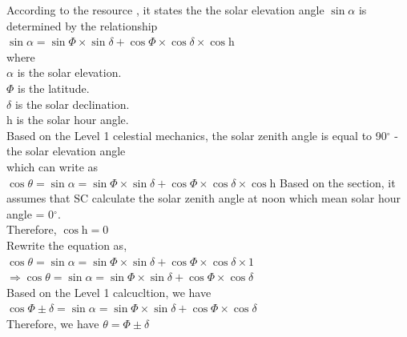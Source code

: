 \documentclass[12pt]{article}
\begin{document}
According to the resource \cite{Harold1968}, it states the the solar elevation
angle $\sin{\alpha}$ is
determined by the relationship\\
$\sin{\alpha} = \sin{\Phi} \times \sin{\delta} + \cos{\Phi} \times \cos{\delta}
\times \cos{\text{h}}$\\
		where \\
		  $\alpha$ is the solar elevation.\\
		  $\Phi$ is the latitude.\\
		  $\delta$ is the solar declination.\\
		  $\text{h}$ is the solar hour angle.\\
Based on the Level 1 celestial mechanics, the solar zenith angle 
is equal to 90$^\circ$ - the solar elevation angle\\
			which can write as\\
$\cos{\theta} = \sin{\alpha} = \sin{\Phi} \times \sin{\delta} + \cos{\Phi}
\times \cos{\delta} \times \cos{\text{h}}$
Based on the  section, it assumes that SC calculate the
solar zenith
angle at noon which mean solar hour angle = 0$^\circ$.\\
			Therefore, $\cos{\text{h}} = 0$\\
				Rewrite the equation as,\\
$\cos{\theta} = \sin{\alpha} = \sin{\Phi} \times \sin{\delta} + \cos{\Phi}
\times \cos{\delta} \times 1$\\
$\Rightarrow \cos{\theta} = \sin{\alpha} = \sin{\Phi} \times \sin{\delta} +
\cos{\Phi} \times \cos{\delta}$\\
			Based on the Level 1 calcucltion, we have\\
$\cos{\Phi \pm \delta} = \sin{\alpha} = \sin{\Phi} \times \sin{\delta} +
\cos{\Phi} \times \cos{\delta}$\\
			Therefore, we have
			$\theta = \Phi \pm \delta$\\




~\newline
\end{document}
